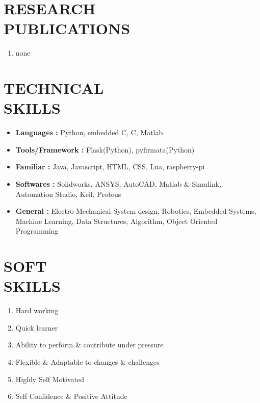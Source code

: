 \documentclass[margin]{res}
\begin{document}
    \section{RESEARCH \\ PUBLICATIONS}
    \begin{enumerate}
        \item none
    \end{enumerate}
  
    \section{TECHNICAL \\ SKILLS}
    \begin{itemize}
    \item \textbf{Languages : } Python, embedded C, C, Matlab 
    \item \textbf{Tools/Framework : } Flask(Python), pyfirmata(Python)
    \item \textbf{Familiar : } Java, Javascript, HTML, CSS, Lua, raspberry-pi  
    \item \textbf{Softwares :} Solidworks, ANSYS, AutoCAD, Matlab \& Simulink, Automation Studio, Keil, Proteus   
    \item \textbf{General : } Electro-Mechanical System design, Robotics, Embedded Systems, Machine Learning, 
                            Data Structures, Algorithm, Object Oriented Programming \\
    \end{itemize}
  
    \section{SOFT \\ SKILLS}
    \begin{enumerate}   
    \item {Hard working }
    \item {Quick learner }
    \item {Ability to perform \& contribute under pressure}
    \item {Flexible \& Adaptable to changes \& challenges}
    \item {Highly Self Motivated}
    \item {Self Confidence \& Positive Attitude}
    \end{enumerate}
  
\(\)
\end{document}
